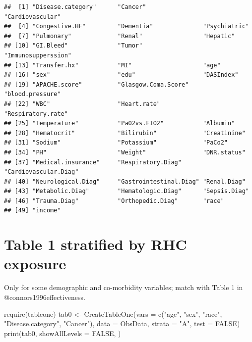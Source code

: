 \documentclass[
]{book}
\newenvironment{Shaded}{\begin{snugshade}}{\end{snugshade}}
\newcommand{\AttributeTok}[1]{\textcolor[rgb]{0.77,0.63,0.00}{#1}}
\newcommand{\ConstantTok}[1]{\textcolor[rgb]{0.00,0.00,0.00}{#1}}
\newcommand{\FunctionTok}[1]{\textcolor[rgb]{0.00,0.00,0.00}{#1}}
\newcommand{\NormalTok}[1]{#1}
\newcommand{\OtherTok}[1]{\textcolor[rgb]{0.56,0.35,0.01}{#1}}
\newcommand{\StringTok}[1]{\textcolor[rgb]{0.31,0.60,0.02}{#1}}
\begin{document}
\begin{verbatim}
##  [1] "Disease.category"      "Cancer"                "Cardiovascular"       
##  [4] "Congestive.HF"         "Dementia"              "Psychiatric"          
##  [7] "Pulmonary"             "Renal"                 "Hepatic"              
## [10] "GI.Bleed"              "Tumor"                 "Immunosupperssion"    
## [13] "Transfer.hx"           "MI"                    "age"                  
## [16] "sex"                   "edu"                   "DASIndex"             
## [19] "APACHE.score"          "Glasgow.Coma.Score"    "blood.pressure"       
## [22] "WBC"                   "Heart.rate"            "Respiratory.rate"     
## [25] "Temperature"           "PaO2vs.FIO2"           "Albumin"              
## [28] "Hematocrit"            "Bilirubin"             "Creatinine"           
## [31] "Sodium"                "Potassium"             "PaCo2"                
## [34] "PH"                    "Weight"                "DNR.status"           
## [37] "Medical.insurance"     "Respiratory.Diag"      "Cardiovascular.Diag"  
## [40] "Neurological.Diag"     "Gastrointestinal.Diag" "Renal.Diag"           
## [43] "Metabolic.Diag"        "Hematologic.Diag"      "Sepsis.Diag"          
## [46] "Trauma.Diag"           "Orthopedic.Diag"       "race"                 
## [49] "income"
\end{verbatim}

\hypertarget{table-1-stratified-by-rhc-exposure}{%
\section{Table 1 stratified by RHC exposure}\label{table-1-stratified-by-rhc-exposure}}

\begin{rmdcomment}
Only for some demographic and co-morbidity variables; match with Table 1
in @connors1996effectiveness.
\end{rmdcomment}

\begin{Shaded}
\begin{Highlighting}[]
\FunctionTok{require}\NormalTok{(tableone)}
\NormalTok{tab0 }\OtherTok{\textless{}{-}} \FunctionTok{CreateTableOne}\NormalTok{(}\AttributeTok{vars =} \FunctionTok{c}\NormalTok{(}\StringTok{"age"}\NormalTok{, }\StringTok{"sex"}\NormalTok{, }\StringTok{"race"}\NormalTok{, }\StringTok{"Disease.category"}\NormalTok{, }\StringTok{"Cancer"}\NormalTok{),}
                       \AttributeTok{data =}\NormalTok{ ObsData, }
                       \AttributeTok{strata =} \StringTok{"A"}\NormalTok{, }
                       \AttributeTok{test =} \ConstantTok{FALSE}\NormalTok{)}
\FunctionTok{print}\NormalTok{(tab0, }\AttributeTok{showAllLevels =} \ConstantTok{FALSE}\NormalTok{, )}
\end{Highlighting}
\end{Shaded}
\end{document}
